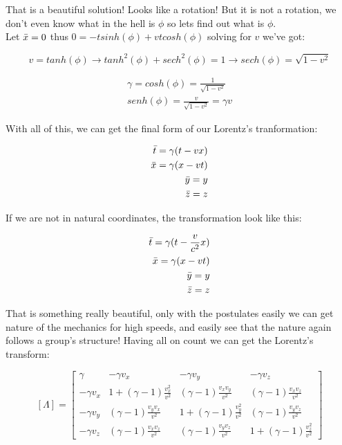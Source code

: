 \documentclass[spanish,notitlepage,letterpaper,11pt]{article} %
\begin{document}
That is a beautiful solution! Looks like a rotation! But it is not a rotation, we don't even know what in the hell is $\phi$ so lets find out what is $\phi$.\\

Let $\Bar{x} = 0$ thus $0 = -tsinh(\phi) + vtcosh(\phi)$ solving for $v$ we've got:

\begin{equation*}
    v = tanh(\phi) \rightarrow tanh^2(\phi)+ sech^2(\phi) = 1 \rightarrow sech(\phi) = \sqrt{1 - v^2}
\end{equation*}

\begin{align}
    \gamma = cosh(\phi) = \frac{1}{\sqrt{1 - v^2}}\\
    senh(\phi) = \frac{v}{\sqrt{1 - v^2}} = \gamma v
\end{align}

With all of this, we can get the final form of our Lorentz's tranformation:

\begin{align*}
    \Bar{t} = \gamma(t-vx)\\
    \Bar{x} = \gamma(x-vt)\\
    \Bar{y} = y\\
    \Bar{z} = z
\end{align*}

If we are not in natural coordinates, the transformation look like this:

\begin{align*}
    \Bar{t} = \gamma(t-\frac{v}{c^2}x)\\
    \Bar{x} = \gamma(x-vt)\\
    \Bar{y} = y\\
    \Bar{z} = z
\end{align*}

That is something really beautiful, only with the postulates easily we can get nature of the mechanics for high speeds, and easily see that the nature again follows a group's structure! Having all on count we can get the Lorentz's transform:

\begin{equation}\label{eq:GLT}
    [\Lambda] =
    \begin{bmatrix}
    \gamma & -\gamma v_x & -\gamma v_y & -\gamma v_z\\
    -\gamma v_x & 1+(\gamma - 1)\frac{v_x^2}{v^2} & (\gamma - 1)\frac{v_xv_y}{v^2} & (\gamma-1)\frac{v_xv_z}{v^2}\\
    -\gamma v_y & (\gamma - 1)\frac{v_yv_x}{v^2} & 1 + (\gamma - 1)\frac{v_y^2}{v^2} & (\gamma-1)\frac{v_yv_z}{v^2}\\
    -\gamma v_z & (\gamma-1)\frac{v_xv_z}{v^2} & (\gamma-1)\frac{v_yv_z}{v^2} & 1 +(\gamma - 1)\frac{v_z^2}{v^2}
    \end{bmatrix}
\end{equation}
\end{document}
